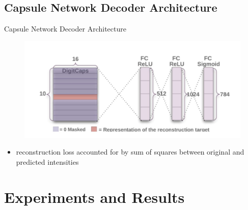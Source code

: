 \documentclass{beamer}
\begin{document}
\subsection{Capsule Network Decoder Architecture}
\begin{frame}{Capsule Network Decoder Architecture}
    \begin{figure}
        \centering
        \includegraphics[scale=0.6]{decoder.JPG}
    \end{figure}
    \begin{itemize}
        \item reconstruction loss accounted for by sum of squares between original and predicted intensities
    \end{itemize}
\end{frame}

\section{Experiments and Results}
\end{document}
